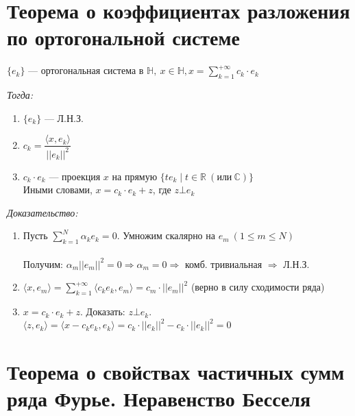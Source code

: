 \documentclass[paper=a4, fontsize=14pt]{report}
\begin{document}
    \section{Теорема о коэффициентах разложения по ортогональной системе}

    $\{e_k\}$ {{---}} ортогональная система в $\mathds{H},\ x \in \mathds{H}, x = \sum\limits_{k=1}^{+\infty} c_k \cdot e_k$

    \emph{Тогда:}
    \begin{enumerate}

        \item $\{e_k\}$ {{---}} Л.Н.З.

        \item $c_k = \dfrac{\langle x, e_k \rangle}{||e_k||^2}$

        \item $c_k \cdot e_k$ {{---}} проекция $x$ на прямую $\{te_k \mid t \in \mathbb{R}\ (\text{или}\ \mathbb{C})\}$\\
        Иными словами, $x = c_k \cdot e_k + z$, где $z \bot e_k$

    \end{enumerate}
    
    
    \emph{Доказательство:}

\begin{enumerate}

	\item Пусть $\sum\limits_{k=1}^{N} \alpha_k e_k = 0$. Умножим скалярно на $e_m\ (1 \leqslant m \leqslant N)$\\ \\
	Получим: $\alpha_m ||e_m||^2 = 0 \Rightarrow \alpha_m = 0 \Rightarrow$ комб. тривиальная $\Rightarrow$ Л.Н.З.

	\item $\langle x, e_m \rangle = \sum\limits_{k=1}^{+\infty} \langle c_k e_k, e_m \rangle = c_m \cdot ||e_m||^2$ (верно в силу сходимости ряда)

	\item $x = c_k \cdot e_k + z$. Доказать: $z \bot e_k$.\\
	$\langle z, e_k \rangle = \langle x - c_k e_k, e_k \rangle = c_k \cdot ||e_k||^2 - c_k\cdot ||e_k||^2 = 0$

\end{enumerate}

\section{Теорема о свойствах частичных сумм ряда Фурье. Неравенство Бесселя}
\end{document}
